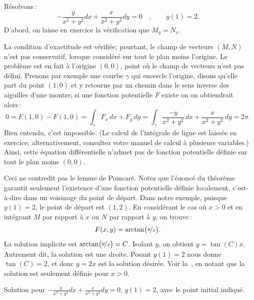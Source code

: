 \begin{example}
Résolvons\,: 
\begin{equation*}
-\frac{y}{x^2+y^2} dx + \frac{x}{x^2+y^2} dy = 0 \quad , \qquad y(1) = 2.
\end{equation*}
D'abord, on laisse en exercice la vérification que 
$M_y = N_x$.

La condition d'exactitude est vérifiée; pourtant, le champ de vecteurs $(M,N)$ n'est pas conservatif, lorsque considéré sur tout le plan moins l'origine.  Le problème est en fait à l'origine $(0,0)$, point où le champ de vecteurs n'est pas défini.   Prenons par exemple une courbe $\gamma$ qui encercle l'origine, disons qu'elle part du point $(1,0)$ et y retourne par un chemin dans le sens inverse des aiguilles d'une montre; si une fonction potentielle $F$ existe on on obtiendrait alors\,: 
\begin{equation*}
0 = F(1,0) - F(1,0) = \int_\gamma F_x \, dx + F_y \, dy = \int_\gamma \frac{-y}{x^2+y^2} \, dx +
\frac{x}{x^2+y^2} \, dy = 2\pi .
\end{equation*}
Bien entendu, c'est impossible.  (Le calcul de l'intégrale de ligne est laissée en exercice; alternativement, consultez votre manuel de calcul à plusieurs variables.)  Ainsi, cette équation différentielle n'admet pas de fonction potentielle définie sur tout le plan moins $(0,0)$.

Ceci ne contredit pas le lemme de Poincaré.  Notez que l'énoncé du théorème garantit seulement l'existence d'une fonction potentielle définie localement, c'est-à-dire dans un voisinage du point de départ.   Dans notre exemple, puisque $y(1) = 2$, le point de départ est $(1,2)$.  En considérant le cas où $x > 0$ et en intégrant $M$ par rapport à $x$ ou $N$ par rapport à $y$, on trouve\,: 
\begin{equation*}
F(x,y) = \operatorname{arctan} \bigl( \nicefrac{y}{x} \bigr) .
\end{equation*}
La solution implicite est 
$\operatorname{arctan} \bigl( \nicefrac{y}{x} \bigr) = C$.  Isolant $y$, on obtient 
$y = \tan(C) x$.  Autrement dit, la solution est une droite.  Posant $y(1) =
2$ nous donne $\tan(C) = 2$, et donc $y= 2x$ est la solution désirée.
Voir la~, en notant que la solution est seulement définie pour $x >
0$.
\begin{myfig}
\capstart
{}
\caption{Solution pour 
$-\frac{y}{x^2+y^2} dx + \frac{x}{x^2+y^2} dy = 0$, $y(1) = 2$,
avec le point initial indiqué.\label{exact:y2x}}
\end{myfig}
\end{example}

